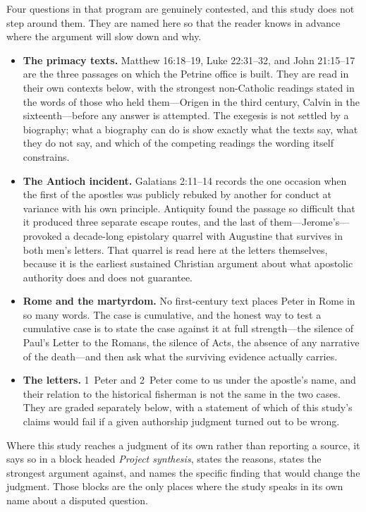 Four questions in that program are genuinely contested, and this study does
not step around them. They are named here so that the reader knows in advance
where the argument will slow down and why.

\begin{itemize}
\item \textbf{The primacy texts.} Matthew 16:18--19, Luke 22:31--32, and
John 21:15--17 are the three passages on which the Petrine office is built.
They are read in their own contexts below, with the strongest non-Catholic
readings stated in the words of those who held them---Origen in the third
century, Calvin in the sixteenth---before any answer is attempted. The
exegesis is not settled by a biography; what a biography can do is show
exactly what the texts say, what they do not say, and which of the competing
readings the wording itself constrains.
\item \textbf{The Antioch incident.} Galatians 2:11--14 records the one
occasion when the first of the apostles was publicly rebuked by another for
conduct at variance with his own principle. Antiquity found the passage so
difficult that it produced three separate escape routes, and the last of
them---Jerome's---provoked a decade-long epistolary quarrel with Augustine
that survives in both men's letters. That quarrel is read here at the letters
themselves, because it is the earliest sustained Christian argument about
what apostolic authority does and does not guarantee.
\item \textbf{Rome and the martyrdom.} No first-century text places Peter in
Rome in so many words. The case is cumulative, and the honest way to test a
cumulative case is to state the case against it at full strength---the
silence of Paul's Letter to the Romans, the silence of Acts, the absence of
any narrative of the death---and then ask what the surviving evidence
actually carries.
\item \textbf{The letters.} 1~Peter and 2~Peter come to us under the
apostle's name, and their relation to the historical fisherman is not the
same in the two cases. They are graded separately below, with a statement of
which of this study's claims would fail if a given authorship judgment
turned out to be wrong.
\end{itemize}

Where this study reaches a judgment of its own rather than reporting a
source, it says so in a block headed \emph{Project synthesis}, states the
reasons, states the strongest argument against, and names the specific
finding that would change the judgment. Those blocks are the only places
where the study speaks in its own name about a disputed question.
